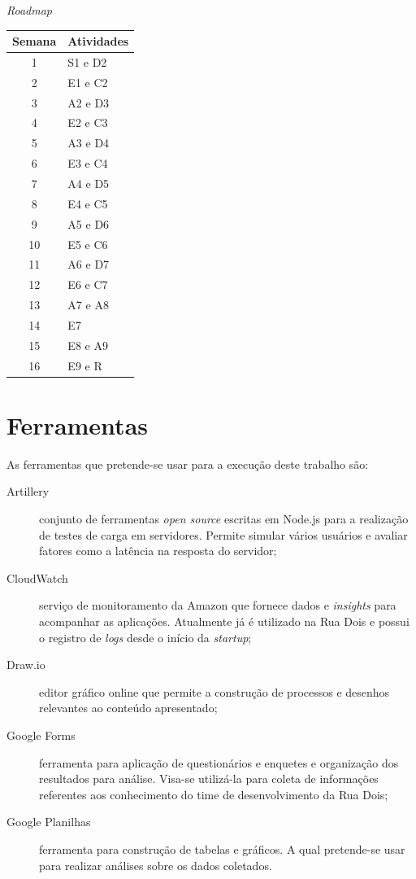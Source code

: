 \begin{quadro}
    \caption{\textit{Roadmap}\label{quad:Roadmap}}
    \begin{tabular}{ | c | l | }
    \hline
    \textbf{Semana} &
        \textbf{Atividades} \\ \hline
        1 & S1 e D2 \\ \hline
        2 & E1 e C2 \\ \hline
        3 & A2 e D3 \\ \hline
        4 & E2 e C3 \\ \hline
        5 & A3 e D4 \\ \hline
        6 & E3 e C4 \\ \hline
        7 & A4 e D5 \\ \hline
        8 & E4 e C5 \\ \hline
        9 & A5 e D6 \\ \hline
        10 & E5 e C6 \\ \hline
        11 & A6 e D7 \\ \hline
        12 & E6 e C7 \\ \hline
        13 & A7 e A8 \\ \hline
        14 & E7 \\ \hline
        15 & E8 e A9 \\ \hline
        16 & E9 e R \\ \hline
    \end{tabular}
\end{quadro}

\section{Ferramentas}

As ferramentas que pretende-se usar para a execução deste trabalho são:

\begin{description}
    \item[Artillery] conjunto de ferramentas \textit{open source} escritas em Node.js
    para a realização de testes de carga em servidores. Permite simular vários usuários
    e avaliar fatores como a latência na resposta do servidor;
    \item[CloudWatch] serviço de monitoramento da Amazon que fornece dados e
    \textit{insights} para acompanhar as aplicações. Atualmente já é utilizado na
    Rua Dois e possui o registro de \textit{logs} desde o início da \textit{startup};
    \item[Draw.io] editor gráfico online que permite a construção de processos e
    desenhos relevantes ao conteúdo apresentado;
    \item[Google Forms] ferramenta para aplicação de questionários e enquetes
    e organização dos resultados para análise. Visa-se utilizá-la para coleta
    de informações referentes aos conhecimento do time de desenvolvimento da Rua Dois;
    \item[Google Planilhas] ferramenta para construção de tabelas e gráficos.
    A qual pretende-se usar para realizar análises sobre os dados coletados.
\end{description}


